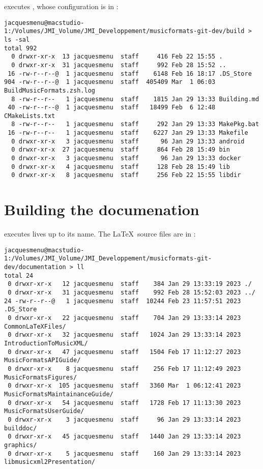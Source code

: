  executes \cmake, whose configuration is in \buildFolder:
\begin{lstlisting}[language=Terminal]
jacquesmenu@macstudio-1:/Volumes/JMI_Volume/JMI_Developpement/musicformats-git-dev/build > ls -sal
total 992
  0 drwxr-xr-x  13 jacquesmenu  staff     416 Feb 22 15:55 .
  0 drwxr-xr-x  31 jacquesmenu  staff     992 Feb 28 15:52 ..
 16 -rw-r--r--@  1 jacquesmenu  staff    6148 Feb 16 18:17 .DS_Store
904 -rw-r--r--@  1 jacquesmenu  staff  405409 Mar  1 06:03 BuildMusicFormats.zsh.log
  8 -rw-r--r--   1 jacquesmenu  staff    1815 Jan 29 13:33 Building.md
 40 -rw-r--r--@  1 jacquesmenu  staff   18499 Feb  6 12:48 CMakeLists.txt
  8 -rw-r--r--   1 jacquesmenu  staff     292 Jan 29 13:33 MakePkg.bat
 16 -rw-r--r--   1 jacquesmenu  staff    6227 Jan 29 13:33 Makefile
  0 drwxr-xr-x   3 jacquesmenu  staff      96 Jan 29 13:33 android
  0 drwxr-xr-x  27 jacquesmenu  staff     864 Feb 28 15:49 bin
  0 drwxr-xr-x   3 jacquesmenu  staff      96 Jan 29 13:33 docker
  0 drwxr-xr-x   4 jacquesmenu  staff     128 Feb 28 15:49 lib
  0 drwxr-xr-x   8 jacquesmenu  staff     256 Feb 22 15:55 libdir
\end{lstlisting}


\section{Building the documenation}

 executes lives up to its name. The \LaTeX\ source files are in \docFolder:
\begin{lstlisting}[language=Terminal]
jacquesmenu@macstudio-1:/Volumes/JMI_Volume/JMI_Developpement/musicformats-git-dev/documentation > ll
total 24
 0 drwxr-xr-x   12 jacquesmenu  staff    384 Jan 29 13:33:19 2023 ./
 0 drwxr-xr-x   31 jacquesmenu  staff    992 Feb 28 15:52:03 2023 ../
24 -rw-r--r--@   1 jacquesmenu  staff  10244 Feb 23 11:57:51 2023 .DS_Store
 0 drwxr-xr-x   22 jacquesmenu  staff    704 Jan 29 13:33:14 2023 CommonLaTeXFiles/
 0 drwxr-xr-x   32 jacquesmenu  staff   1024 Jan 29 13:33:14 2023 IntroductionToMusicXML/
 0 drwxr-xr-x   47 jacquesmenu  staff   1504 Feb 17 11:12:27 2023 MusicFormatsAPIGuide/
 0 drwxr-xr-x    8 jacquesmenu  staff    256 Feb 17 11:12:49 2023 MusicFormatsFigures/
 0 drwxr-xr-x  105 jacquesmenu  staff   3360 Mar  1 06:12:41 2023 MusicFormatsMaintainanceGuide/
 0 drwxr-xr-x   54 jacquesmenu  staff   1728 Feb 17 11:13:30 2023 MusicFormatsUserGuide/
 0 drwxr-xr-x    3 jacquesmenu  staff     96 Jan 29 13:33:14 2023 builddoc/
 0 drwxr-xr-x   45 jacquesmenu  staff   1440 Jan 29 13:33:14 2023 graphics/
 0 drwxr-xr-x    5 jacquesmenu  staff    160 Jan 29 13:33:14 2023 libmusicxml2Presentation/
\end{lstlisting}

